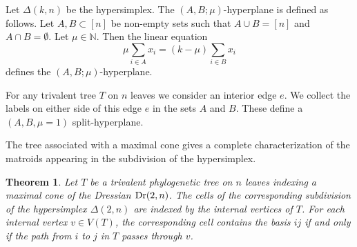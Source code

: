 \documentclass[12pt]{article}
\DeclareMathOperator{\Dr}{\rm Dr}
\theoremstyle{plain}
\newtheorem{theorem}{Theorem}
\theoremstyle{definition}
\numberwithin{subcase}{case}
\begin{document}
Let $\Delta(k,n)$ be the hypersimplex. The $(A, B; \mu)$-hyperplane \cite{herrmann2008splitting} is defined as follows.
Let $A,B \subset [n]$ be non-empty sets such that $A \cup B = [n]$ and $A \cap B = \emptyset$. Let $\mu \in \mathbb{N}$. Then the linear equation
\[ \mu \sum_{i \in A} x_{i}  = (k - \mu) \sum_{i \in B} x_{i}\]
defines the $(A, B; \mu)$-hyperplane.

For any trivalent tree $T$ on $n$ leaves we consider an interior edge $e$. We collect the labels on either side of this edge $e$ in the sets $A$ and $B$. These define a $(A,B, \mu=1)$ split-hyperplane. 


The tree associated with a maximal cone gives a complete characterization of the matroids appearing in the subdivision of the hypersimplex.

\begin{theorem}
Let $T$ be a trivalent phylogenetic tree on $n$ leaves indexing a maximal cone of the Dressian $\Dr(2,n)$. The cells of the corresponding subdivision of the hypersimplex $\Delta(2,n)$ are indexed by the internal vertices of $T$. For each internal vertex $v \in V(T)$, the corresponding cell contains the basis $ij$ if and only if the path from $i$ to $j$ in $T$ passes through $v$.
\end{theorem}
\end{document}

